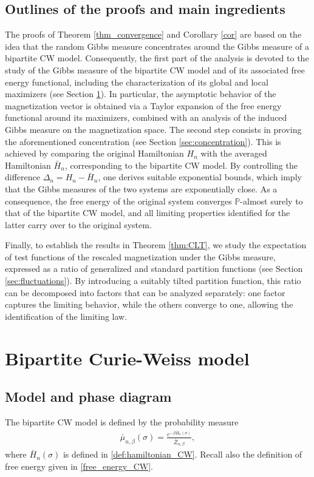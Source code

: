 \documentclass[11pt,oneside]{amsart}
\numberwithin{equation}{section}  %
\theoremstyle{plain}
\theoremstyle{remark}
\begin{document}
\subsection{Outlines of the proofs and main ingredients}
The proofs of Theorem \ref{thm_convergence} and Corollary \ref{cor} are based on the idea that the random Gibbs measure  
concentrates around the Gibbs measure of a bipartite CW model. 
Consequently, the first part of the analysis is devoted to the study of the Gibbs measure of the bipartite CW model and of its associated free energy functional, including the characterization of its global and local maximizers (see Section \ref{sec:CW}). 
In particular, the asymptotic behavior of the magnetization vector is obtained via a Taylor expansion of the free energy functional around its maximizers, combined with an analysis of the induced Gibbs measure on the magnetization space.
The second step consists in proving the aforementioned concentration (see Section \ref{sec:concentration}). 
This is achieved by comparing the original Hamiltonian $H_n$ with the averaged Hamiltonian $\bar H_n$, 
corresponding to the bipartite CW model. By controlling the difference $\Delta_n = H_n - \bar H_n$, 
one derives suitable exponential bounds, which imply that the Gibbs measures of the two systems are exponentially close. As a consequence, the free energy of the original system converges $\mathbb{P}$-almost surely to that of the bipartite CW model, 
and all limiting properties identified for the latter carry over to the original system.

Finally, to establish the results in Theorem \ref{thm:CLT}, we study the expectation of test functions of the rescaled magnetization under the Gibbs measure, expressed as a ratio of generalized and standard partition functions (see Section \ref{sec:fluctuations}). By introducing a suitably tilted partition function, this ratio can be decomposed into factors that can be analyzed separately: one factor captures the limiting behavior, while the others converge to one, allowing the identification of the limiting law.



\section{Bipartite Curie-Weiss model}
\label{sec:CW}

\subsection{Model and phase diagram}
The bipartite CW model is defined by the probability measure
\begin{align}\label{def:gibbs_CW}
    \bar{\mu}_{n,\beta}(\sigma)=\frac{e^{-\beta \bar{H}_n(\sigma)}}{\bar{Z}_{n,\beta}},
\end{align}
where $\bar{H}_n(\sigma)$ is defined in \eqref{def:hamiltonian_CW}.
Recall also the definition of free energy given in \eqref{free_energy_CW}. 
\end{document}
